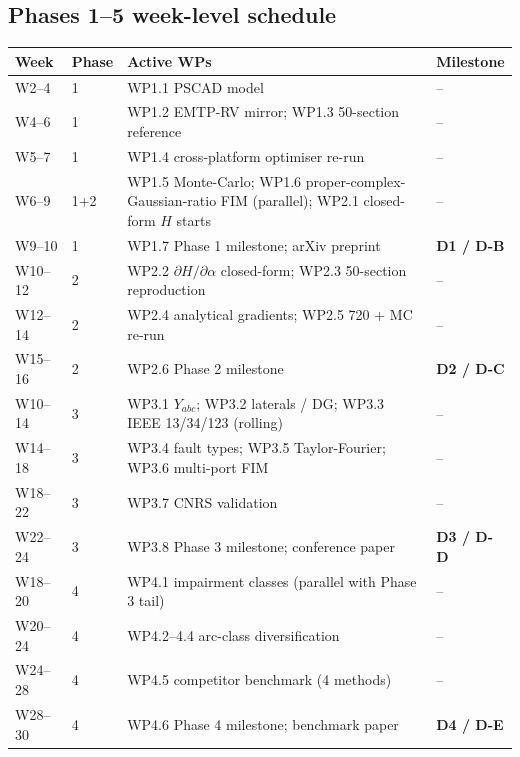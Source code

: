 \documentclass[11pt,a4paper]{article}
\begin{document}
\subsection{Phases 1--5 week-level schedule}

\renewcommand{\arraystretch}{1.10}
\begin{longtable}{L{1.4cm}C{1.1cm}L{8.0cm}L{3.8cm}}
\toprule{}
\textbf{Week} & \textbf{Phase} & \textbf{Active WPs} & \textbf{Milestone}\\\midrule\endhead
W2--4   & 1   & WP1.1 PSCAD model                                               & --\\
W4--6   & 1   & WP1.2 EMTP-RV mirror; WP1.3 50-section reference                & --\\
W5--7   & 1   & WP1.4 cross-platform optimiser re-run                           & --\\
W6--9   & 1+2 & WP1.5 Monte-Carlo; WP1.6 proper-complex-Gaussian-ratio FIM (parallel); WP2.1 closed-form $H$ starts & --\\
W9--10  & 1   & WP1.7 Phase 1 milestone; arXiv preprint                         & \textbf{D1 / D-B}\\
W10--12 & 2   & WP2.2 $\partial H/\partial\alpha$ closed-form; WP2.3 50-section reproduction & --\\
W12--14 & 2   & WP2.4 analytical gradients; WP2.5 720 + MC re-run               & --\\
W15--16 & 2   & WP2.6 Phase 2 milestone                                         & \textbf{D2 / D-C}\\
W10--14 & 3   & WP3.1 $Y_{abc}$; WP3.2 laterals / DG; WP3.3 IEEE 13/34/123 (rolling) & --\\
W14--18 & 3   & WP3.4 fault types; WP3.5 Taylor-Fourier; WP3.6 multi-port FIM   & --\\
W18--22 & 3   & WP3.7 CNRS validation                                           & --\\
W22--24 & 3   & WP3.8 Phase 3 milestone; conference paper                       & \textbf{D3 / D-D}\\
W18--20 & 4   & WP4.1 impairment classes (parallel with Phase 3 tail)           & --\\
W20--24 & 4   & WP4.2--4.4 arc-class diversification                            & --\\
W24--28 & 4   & WP4.5 competitor benchmark (4 methods)                          & --\\
W28--30 & 4   & WP4.6 Phase 4 milestone; benchmark paper                        & \textbf{D4 / D-E}\\

\end{longtable}
\end{document}
